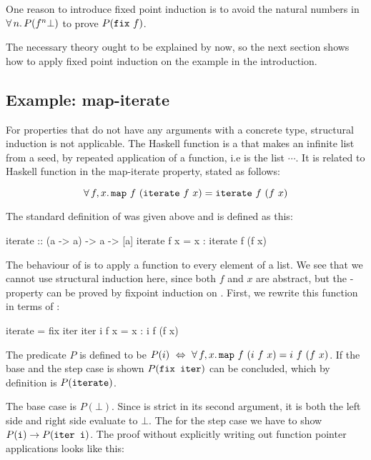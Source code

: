 \noindent
One reason to introduce fixed point induction is to avoid the natural
numbers in $\forall \, n . \, P(f^n \bot)$ to prove $P(\texttt{fix} \,\, f)$.

The necessary theory ought to be explained by now, so the next section
shows how to apply fixed point induction on the example in the
introduction.

\subsection{Example: map-iterate}
\label{sec:mapiter}

For properties that do not have any arguments with a concrete type,
structural induction is not applicable. The Haskell function
 is a that makes an infinite list from a seed, by repeated
application of a function, i.e  is the list
 $\cdots$. It is related to Haskell function
  in the map-iterate property, stated as follows:

\begin{equation*}
\forall \, f , x . \, \texttt{map} \,\, f \,\, (\texttt{iterate} \,\, f \,\, x) =
           \texttt{iterate} \,\, f \,\, (f \,\, x)
\end{equation*}

\noindent
The standard definition of  was given above and 
is defined as this:

\begin{code}
iterate :: (a -> a) -> a -> [a]
iterate f x = x : iterate f (f x)
\end{code}

The behaviour of  is to apply a function to every element of a
list. We see that we cannot use structural induction here, since both
$f$ and $x$ are abstract, but the - property can
be proved by fixpoint induction on . First, we rewrite
this function in terms of :

\begin{code}
iterate = fix iter
iter i f x = x : i f (f x)
\end{code}

\noindent
The predicate $P$ is defined to be $P(i) \,\, \Leftrightarrow \,\,
\forall \, f , x . \, \texttt{map} \,\, f \,\, (i \,\, f \,\, x) = i \,\, f \,\, (f \,\, x)$.
If the base and the step case is shown $P(\texttt{fix iter})$ can be
concluded, which by definition is $P(\texttt{iterate})$.

The base case is $P(\bot)$. Since  is strict in its second
argument, it is both the left side and right side evaluate to $\bot$.
The for the step case we have to show $P(\texttt{i}) \rightarrow
P(\texttt{iter i})$.  The proof without explicitly writing out function
pointer applications looks like this:

